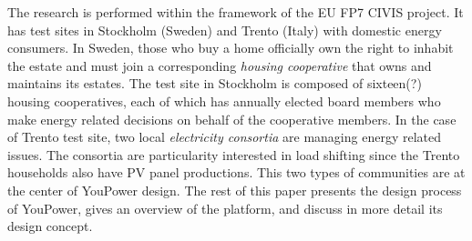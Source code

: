 The research is performed within the framework of the EU FP7 CIVIS project. It has test sites in Stockholm (Sweden) and Trento (Italy) with domestic energy consumers. 
% 
In Sweden, those who buy a home officially own the right to inhabit the estate and must join a corresponding \textit{housing cooperative} 
that owns and maintains its estates. The test site in Stockholm is composed of sixteen(?) housing cooperatives, each of which has annually elected board members who make energy related decisions on behalf of the cooperative members. 
In the case of Trento test site, two local \textit{electricity consortia} are managing energy related issues. The consortia are particularity  interested in load shifting since the Trento households also have PV panel productions.  
This two types of communities are at the center of YouPower design. 
% 
The rest of this paper presents the design process of YouPower, gives an overview of the platform, and discuss in more detail its design concept.

